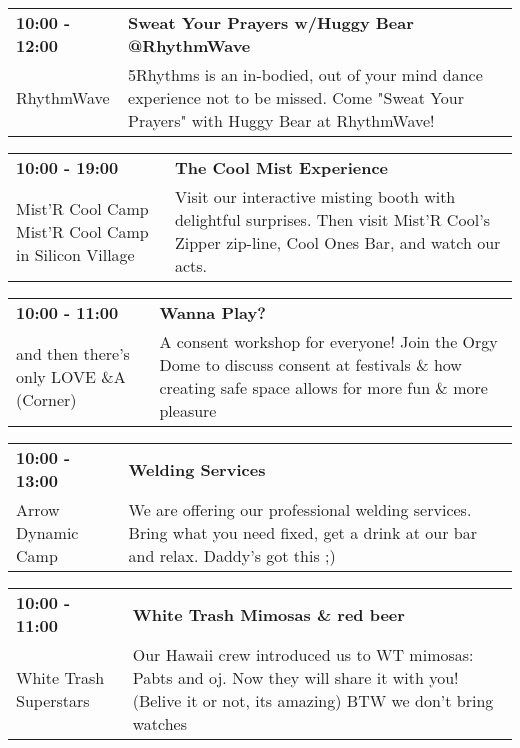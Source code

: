 \begin{tabular}{ p{1in} p{2.2in} }
    \textbf{10:00 - 12:00} & \textbf{Sweat Your Prayers w/Huggy Bear @RhythmWave} \\
    RhythmWave \newline  & 5Rhythms is an in-bodied, out of your mind dance experience not to be missed. Come "Sweat Your Prayers" with Huggy Bear at RhythmWave! \\
    \hline 
\end{tabular}
    
\begin{tabular}{ p{1in} p{2.2in} }
    \textbf{10:00 - 19:00} & \textbf{The Cool Mist Experience} \\
    Mist'R Cool Camp \newline Mist'R Cool Camp in Silicon Village & Visit our interactive misting booth with delightful surprises. Then visit Mist'R Cool's Zipper zip-line, Cool Ones Bar, and watch our acts. \\
    \hline 
\end{tabular}
    
\begin{tabular}{ p{1in} p{2.2in} }
    \textbf{10:00 - 11:00} & \textbf{Wanna Play?} \\
    and then there's only LOVE \newline 4\&A (Corner) & A consent workshop for everyone! Join the Orgy Dome to discuss consent at festivals \& how creating safe space allows for more fun \& more pleasure \\
    \hline 
\end{tabular}
    
\begin{tabular}{ p{1in} p{2.2in} }
    \textbf{10:00 - 13:00} & \textbf{Welding Services} \\
    Arrow Dynamic Camp \newline  & We are offering our professional welding services.  Bring what you need fixed, get a drink at our bar and relax. Daddy's got this ;) \\
    \hline 
\end{tabular}
    
\begin{tabular}{ p{1in} p{2.2in} }
    \textbf{10:00 - 11:00} & \textbf{White Trash Mimosas \& red beer} \\
    White Trash Superstars \newline  & Our Hawaii crew introduced us to WT mimosas: Pabts and oj. Now they will share it with you! (Belive it or not, its amazing) BTW we don't bring watches \\
    \hline 
\end{tabular}
    
